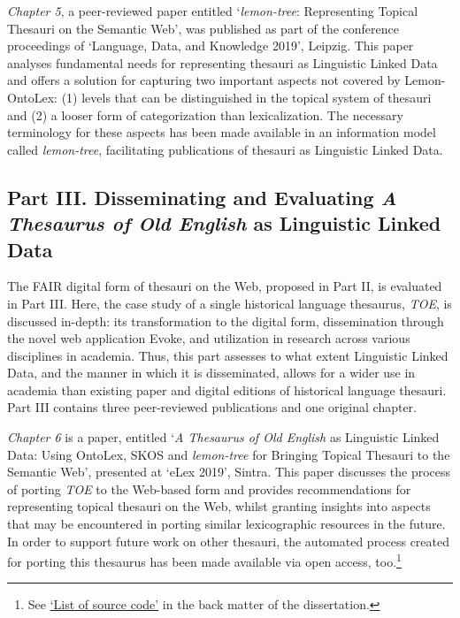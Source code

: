 \textit{Chapter 5}, a peer-reviewed paper entitled `\textit{lemon-tree}: Representing Topical Thesauri on the Semantic Web', was published as part of the conference proceedings of `Language, Data, and Knowledge 2019', Leipzig. 
This paper analyses fundamental needs for representing thesauri as Linguistic Linked Data and offers a solution for capturing two important aspects not covered by Lemon-OntoLex: (1) levels that can be distinguished in the topical system of thesauri and (2) a looser form of categorization than lexicalization. The necessary terminology for these aspects has been made available in an information model called \emph{lemon-tree}, facilitating publications of thesauri as Linguistic Linked Data.

\subsection*{Part III. Disseminating and Evaluating \textit{A Thesaurus of Old English} as Linguistic Linked Data}

The FAIR digital form of thesauri on the Web, proposed in Part II, is evaluated in Part III. Here, the case study of a single historical language thesaurus, \textit{TOE}, is discussed in-depth: its transformation to the digital form, dissemination through the novel web application Evoke, and utilization in research across various disciplines in academia. Thus, this part assesses to what extent Linguistic Linked Data, and the manner in which it is disseminated, allows for a wider use in academia than existing paper and digital editions of historical language thesauri. Part III contains three peer-reviewed publications and one original chapter. 

\textit{Chapter 6} is a paper, entitled `\emph{A Thesaurus of Old English} as Linguistic Linked Data: Using OntoLex, SKOS and \emph{lemon-tree} for Bringing Topical Thesauri to the Semantic Web', presented at `eLex 2019', Sintra. This paper discusses the process of porting \textit{TOE} to the Web-based form and provides recommendations for representing topical thesauri on the Web, whilst granting insights into aspects that may be encountered in porting similar lexicographic resources in the future. In order to support future work on other thesauri, the automated process created for porting this thesaurus has been made available via open access, too.\footnote{See \hyperref[fm:sourcecode]{`List of source code'} in the back matter of the dissertation.}


